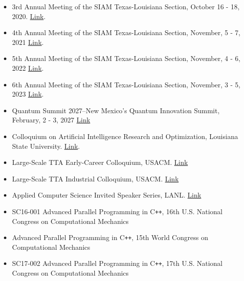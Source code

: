 \documentclass[11pt,a4paper,sans]{moderncv}
\begin{document}
\begin{itemize}[leftmargin=4cm]
\item 3rd Annual Meeting of the SIAM Texas-Louisiana Section, October 16 - 18,  2020. \href{https://www.math.tamu.edu/conferences/SIAMTXLA/}{Link}.
\item 4th Annual Meeting of the SIAM Texas-Louisiana Section,  November,  5 - 7,  2021 \href{https://faculty.utrgv.edu/eleftherios.gkioulekas/2021-siam-txla-meeting-spi/index.html}{Link}.
\item 5th Annual Meeting of the SIAM Texas-Louisiana Section,  November,  4 - 6,  2022 \href{https://www.math.uh.edu/siamtxla22/index.shtml}{Link}.
\item 6th Annual Meeting of the SIAM Texas-Louisiana Section,  November,  3 - 5,  2023 \href{https://userweb.ucs.louisiana.edu/~C00424602/SIAMTXLA2023/}{Link}.
\item Quantum Summit 2027--New Mexico's Quantum Innovation Summit, February, 2 - 3, 2027 \href{https://web.cvent.com/event/fa33071f-a748-44d0-8fc6-67c178406d63/summary}{Link}

\end{itemize}

\begin{itemize}[leftmargin=4cm]
\item Colloquium on Artificial Intelligence Research and Optimization, Louisiana State University. \href{https://stellar-group.org/research/distributed-machine-learning/}{Link}.
\item Large-Scale TTA Early-Career Colloquium, USACM. \href{https://www.usacm.org/site_page.cfm?pk_association_webpage_menu=11354&pk_association_webpage=25779}{Link}
\item Large-Scale TTA Industrial Colloquium, USACM. \href{https://www.usacm.org/site_page.cfm?pk_association_webpage_menu=11354&pk_association_webpage=25779}{Link}
\item Applied Computer Science Invited Speaker Series, LANL. \href{http://appliedcomputerscienceseries.lanl.gov/}{Link}
\end{itemize}

\begin{itemize}[leftmargin=4cm]
\item SC16-001 Advanced Parallel Programming in C\texttt{++}, 16th U.S. National Congress on Computational Mechanics
\item Advanced Parallel Programming in C\texttt{++}, 15th World Congress on Computational Mechanics
\item SC17-002 Advanced Parallel Programming in C\texttt{++}, 17th U.S. National Congress on Computational Mechanics
\end{itemize}
\end{document}
